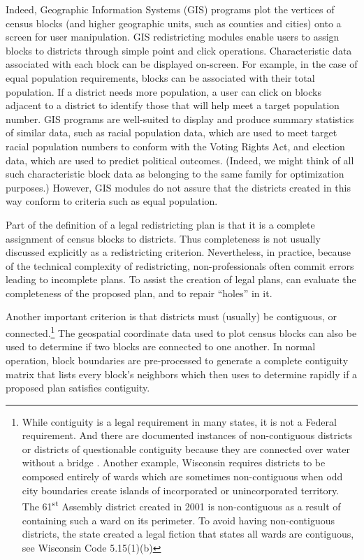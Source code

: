 \documentclass[article]{JSSstyle/jss}
\begin{document}
Indeed, Geographic Information Systems (GIS) 
programs plot the vertices of census blocks (and higher geographic 
units, such as counties and cities) onto a screen for user 
manipulation.  GIS redistricting modules enable users to assign 
blocks to districts through simple point and click operations. 
Characteristic data associated with each block can be displayed 
on-screen.  For example, in the case of equal population 
requirements, blocks can be associated with their total population.  
If a district needs more population, a user can click on blocks 
adjacent to a district to identify those that will help meet a 
target population number.  GIS programs are well-suited to display 
and produce summary statistics of similar data, such as racial 
population data, which are used to meet target racial population 
numbers to conform with the Voting Rights Act, and election data, 
which are used to predict political outcomes. (Indeed, we might think 
of all such characteristic block data as belonging to the same 
family for optimization purposes.) However, GIS modules do not assure that the districts created in this way conform to criteria such as equal population.

Part of the definition of a legal redistricting plan is that it 
is a complete assignment of census blocks to districts. Thus completeness 
is not usually discussed explicitly as a redistricting criterion. Nevertheless, 
in practice, because of the technical complexity of redistricting, 
non-professionals often commit errors leading to incomplete plans. To 
assist the creation of legal plans,  can evaluate the 
completeness of the proposed plan, and to repair ``holes'' in it. 

Another important criterion is that districts must (usually) be contiguous, or 
connected.\footnote{While contiguity is  a legal requirement in many states, it is
not a Federal requirement. And there are documented instances of 
non-contiguous districts or districts of questionable contiguity because 
they are connected over water without a bridge \citep[][]{Altman98}.  
Another example, Wisconsin requires districts to be composed entirely 
of wards which are sometimes non-contiguous when odd city boundaries create islands of 
incorporated or unincorporated territory.  The 61\textsuperscript{st} Assembly district created in 2001 is non-contiguous 
as a result of containing such a ward on its perimeter.  To 
avoid having non-contiguous districts, the state created a legal 
fiction that states all wards are contiguous, see Wisconsin Code 5.15(1)(b)}   
The geospatial coordinate data used to plot census blocks can also be used to determine if two blocks are connected to one another.  In normal operation,
block boundaries are pre-processed to generate a complete contiguity matrix that  
lists every block's neighbors which  then uses to determine rapidly if 
a proposed plan satisfies contiguity.
\end{document}
